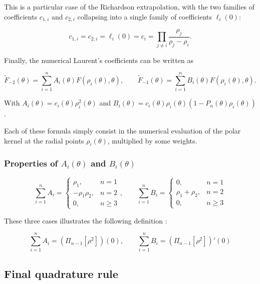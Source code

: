 ﻿\documentclass{article}
\begin{document}
This is a particular case of the Richardson extrapolation, with the two families of coefficients $c_{1, i}$ and $c_{2, i}$ collapsing into a single family of coefficients $\ell_i(0)$:

$$c_{1, i} = c_{2, i} = \ell_i(0) = c_i = \prod_{j\neq i}\frac{\rho_j}{\rho_j - \rho_i}.$$

Finally, the numerical Laurent's coefficients can be written as

\begin{equation}
  \widetilde F_{-2}(\theta) = \sum_{i=1}^{n}A_i(\theta)F(\rho_i(\theta), \theta), \qquad \widetilde F_{-1}(\theta) = \sum_{i=1}^{n}B_i(\theta)F(\rho_i(\theta), \theta).
\end{equation}

With $A_i(\theta) = c_i(\theta)\rho_i^2(\theta)$ and $B_i(\theta) = c_i(\theta)\rho_i(\theta)\left(1 - P_n(\theta)\rho_i(\theta)\right)$.

Each of these formula simply consist in the numerical evaluation of the polar kernel at the radial points $\rho_i(\theta)$, multiplied by some weights.

\subsubsection{Properties of $A_i(\theta)$ and $B_i(\theta)$}

\begin{equation}
  \sum_{i=1}^{n} A_i = 
  \begin{cases}
    \rho_1, & n = 1 \\
    -\rho_1\rho_2, & n = 2 \\
    0, & n \geq 3
  \end{cases}, \qquad
  \sum_{i=1}^{n} B_i = 
  \begin{cases}
    0, & n = 1 \\
    \rho_1 + \rho_2, & n = 2 \\
    0, & n \geq 3
  \end{cases}
\end{equation}

These three cases illustrates the following definition :

\begin{equation}
  \sum_{i=1}^{n} A_i = (\Pi_{n-1}[\rho^2])(0), \qquad \sum_{i=1}^{n} B_i = (\Pi_{n-1}[\rho^2])'(0)
\end{equation}

\subsection{Final quadrature rule}
\end{document}

